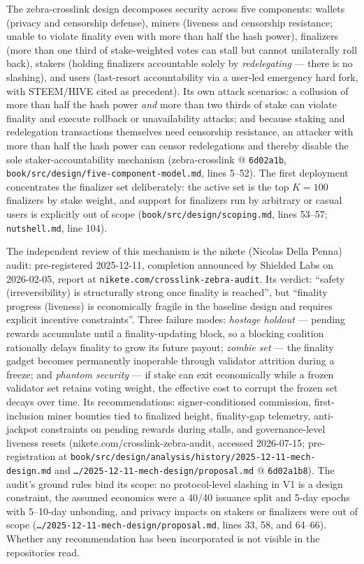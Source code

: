 \documentclass[11pt,a4paper]{article}
\theoremstyle{definition}
\begin{document}
The zebra-crosslink design decomposes security across five components:
wallets (privacy and censorship defense), miners (liveness and
censorship resistance; unable to violate finality even with more than
half the hash power), finalizers (more than one third of stake-weighted
votes can stall but cannot unilaterally roll back), stakers (holding
finalizers accountable solely by \emph{redelegating} --- there is no
slashing), and users (last-resort accountability via a user-led emergency
hard fork, with STEEM/HIVE cited as precedent). Its own attack scenarios:
a collusion of more than half the hash power \emph{and} more than two
thirds of stake can violate finality and execute rollback or
unavailability attacks; and because staking and redelegation transactions
themselves need censorship resistance, an attacker with more than half
the hash power can censor redelegations and thereby disable the sole
staker-accountability mechanism (zebra-crosslink @ \texttt{6d02a1b},
\texttt{book/src/design/five-component-model.md}, lines 5--52). The first
deployment concentrates the finalizer set deliberately: the active set is
the top $K = 100$ finalizers by stake weight, and support for
finalizers run by arbitrary or casual users is explicitly out of scope
(\texttt{book/src/design/scoping.md}, lines 53--57;
\texttt{nutshell.md}, line 104).

The independent review of this mechanism is the nikete (Nicolas Della
Penna) audit: pre-registered 2025-12-11, completion announced by Shielded
Labs on 2026-02-05, report at \texttt{nikete.com/crosslink-zebra-audit}.
Its verdict: ``safety (irreversibility) is structurally strong once
finality is reached'', but ``finality progress (liveness) is economically
fragile in the baseline design and requires explicit incentive
constraints''. Three failure modes: \emph{hostage holdout} --- pending
rewards accumulate until a finality-updating block, so a blocking
coalition rationally delays finality to grow its future payout;
\emph{zombie set} --- the finality gadget becomes permanently inoperable
through validator attrition during a freeze; and \emph{phantom security}
--- if stake can exit economically while a frozen validator set retains
voting weight, the effective cost to corrupt the frozen set decays over
time. Its recommendations: signer-conditioned commission, first-inclusion
miner bounties tied to finalized height, finality-gap telemetry,
anti-jackpot constraints on pending rewards during stalls, and
governance-level liveness resets (nikete.com/crosslink-zebra-audit,
accessed 2026-07-15; pre-registration at
\texttt{book/src/design/analysis/history/2025-12-11-mech-design.md} and
\texttt{\ldots/2025-12-11-mech-design/proposal.md} @ \texttt{6d02a1b8}).
The
audit's ground rules bind its scope: no protocol-level slashing in V1 is
a design constraint, the assumed economics were a 40/40 issuance split
and 5-day epochs with 5--10-day unbonding, and privacy impacts on stakers
or finalizers were out of scope
(\texttt{\ldots/2025-12-11-mech-design/proposal.md}, lines 33, 58, and
64--66). Whether any recommendation has been incorporated is not visible
in the repositories read.
\end{document}
